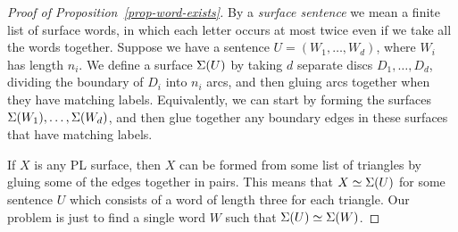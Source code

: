 \documentclass[reqno]{amsart}
\theoremstyle{definition}
\begin{document}
\begin{proof}[Proof of Proposition~\ref{prop-word-exists}]
 By a \emph{surface sentence} we mean a finite list of surface words,
 in which each letter occurs at most twice even if we take all the
 words together.  Suppose we have a sentence $U=(W_1,\dotsc,W_d)$,
 where $W_i$ has length $n_i$.  We define a surface $\Sigma(U)$ by taking
 $d$ separate discs $D_1,\dotsc,D_d$, dividing the boundary of $D_i$
 into $n_i$ arcs, and then gluing arcs together when they have
 matching labels.  Equivalently, we can start by forming the surfaces
 $\Sigma(W_1),\dotsc,\Sigma(W_d)$, and then glue together any boundary edges
 in these surfaces that have matching labels.

 If $X$ is any PL surface, then $X$ can be formed from some list of
 triangles by gluing some of the edges together in pairs.  This means
 that $X\simeq\Sigma(U)$ for some sentence $U$ which consists of a word
 of length three for each triangle.  Our problem is just to find a
 single word $W$ such that $\Sigma(U)\simeq\Sigma(W)$.


\end{proof}
\end{document}
